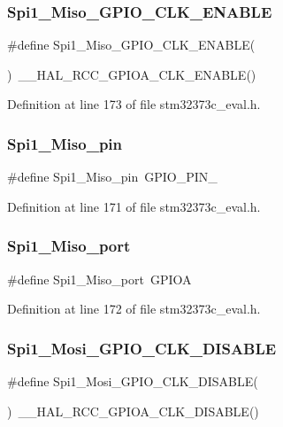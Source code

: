 \subsubsection{Spi1\+\_\+\+Miso\+\_\+\+G\+P\+I\+O\+\_\+\+C\+L\+K\+\_\+\+E\+N\+A\+B\+LE}
{\footnotesize\ttfamily \#define Spi1\+\_\+\+Miso\+\_\+\+G\+P\+I\+O\+\_\+\+C\+L\+K\+\_\+\+E\+N\+A\+B\+LE(\begin{DoxyParamCaption}{ }\end{DoxyParamCaption})~\+\_\+\+\_\+\+H\+A\+L\+\_\+\+R\+C\+C\+\_\+\+G\+P\+I\+O\+A\+\_\+\+C\+L\+K\+\_\+\+E\+N\+A\+B\+LE()}



Definition at line 173 of file stm32373c\+\_\+eval.\+h.

\mbox{\label{group___l_e_d_gaf2618952cb00f314b53c914d29a6af09}} 
\subsubsection{Spi1\+\_\+\+Miso\+\_\+pin}
{\footnotesize\ttfamily \#define Spi1\+\_\+\+Miso\+\_\+pin~G\+P\+I\+O\+\_\+\+P\+I\+N\+\_}



Definition at line 171 of file stm32373c\+\_\+eval.\+h.

\mbox{\label{group___l_e_d_ga6029aa340c4d347a01797c5a85bb7867}} 
\subsubsection{Spi1\+\_\+\+Miso\+\_\+port}
{\footnotesize\ttfamily \#define Spi1\+\_\+\+Miso\+\_\+port~G\+P\+I\+OA}



Definition at line 172 of file stm32373c\+\_\+eval.\+h.

\mbox{\label{group___l_e_d_gafdaadd82e56f28b35fe12d89d1bacc45}} 
\subsubsection{Spi1\+\_\+\+Mosi\+\_\+\+G\+P\+I\+O\+\_\+\+C\+L\+K\+\_\+\+D\+I\+S\+A\+B\+LE}
{\footnotesize\ttfamily \#define Spi1\+\_\+\+Mosi\+\_\+\+G\+P\+I\+O\+\_\+\+C\+L\+K\+\_\+\+D\+I\+S\+A\+B\+LE(\begin{DoxyParamCaption}{ }\end{DoxyParamCaption})~\+\_\+\+\_\+\+H\+A\+L\+\_\+\+R\+C\+C\+\_\+\+G\+P\+I\+O\+A\+\_\+\+C\+L\+K\+\_\+\+D\+I\+S\+A\+B\+LE()}



